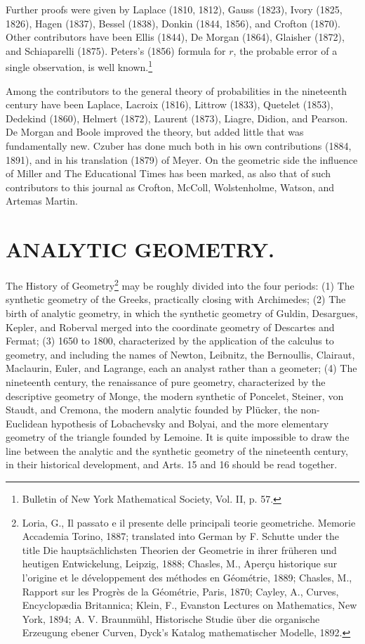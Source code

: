 \documentclass[oneside]{book}
\begin{document}
{Further proofs were given by Laplace (1810, 1812), Gauss (1823),
Ivory (1825, 1826), Hagen (1837), Bessel (1838), Donkin (1844,
1856), and Crofton (1870). Other contributors have been Ellis
(1844), De Morgan (1864), Glaisher (1872), and Schiaparelli
(1875). Peters's (1856) formula for $r$, the probable error of a
single observation, is well known.\footnote{Bulletin of New York
Mathematical Society, Vol. II, p. 57.}

Among the contributors to the general theory of probabilities in
the nineteenth century have been Laplace, Lacroix (1816), Littrow
(1833), Quetelet (1853), Dedekind (1860), Helmert (1872), Laurent
(1873), Liagre, Didion, and Pearson. De Morgan and Boole improved
the theory, but added little that was fundamentally new. Czuber has
done much both in his own contributions (1884, 1891), and in his
translation (1879) of Meyer. On the geometric side the influence of
Miller and The Educational Times has been marked, as also that of
such contributors to this journal as Crofton, McColl, Wolstenholme,
Watson, and Artemas Martin.

\chapter{ANALYTIC GEOMETRY.}

The History of Geometry\footnote{Loria, G., Il passato e il presente
delle principali teorie geometriche. Memorie Accademia Torino,
1887; translated into German by F. Schutte under the title Die
haupts\"achlichsten Theorien der Geometrie in ihrer fr\"uheren und
heutigen Entwickelung, Leipzig, 1888; Chasles, M., Aper\c{c}u
historique sur l'origine et le d\'eveloppement des m\'ethodes en
G\'eom\'etrie, 1889; Chasles, M., Rapport sur les Progr\`es de la
G\'eom\'etrie, Paris, 1870; Cayley, A., Curves, Encyclop\ae{}dia
Britannica; Klein, F., Evanston Lectures on Mathematics, New York,
1894; A. V. Braunm\"uhl, Historische Studie \"uber die organische
Erzeugung ebener Curven, Dyck's Katalog mathematischer Modelle,
1892.} may be roughly divided into the four periods: (1) The
synthetic geometry of the Greeks, practically closing with
Archimedes; (2) The birth of analytic geometry, in which the
synthetic geometry of Guldin, Desargues, Kepler, and Roberval merged
into the coordinate geometry of Descartes and Fermat; (3) 1650 to
1800, characterized by the application of the calculus to geometry,
and including the names of Newton, Leibnitz, the Bernoullis,
Clairaut, Maclaurin, Euler, and Lagrange, each an analyst rather
than a geometer; (4) The nineteenth century, the renaissance of pure
geometry, characterized by the descriptive geometry of Monge, the
modern synthetic of Poncelet, Steiner, von Staudt, and Cremona, the
modern analytic founded by Pl\"ucker, the non-Euclidean hypothesis
of Lobachevsky and Bolyai, and the more elementary geometry of the
triangle founded by Lemoine. It is quite impossible to draw the
line between the analytic and the synthetic geometry of the
nineteenth century, in their historical development, and Arts. 15
and 16 should be read together.

}
\end{document}

